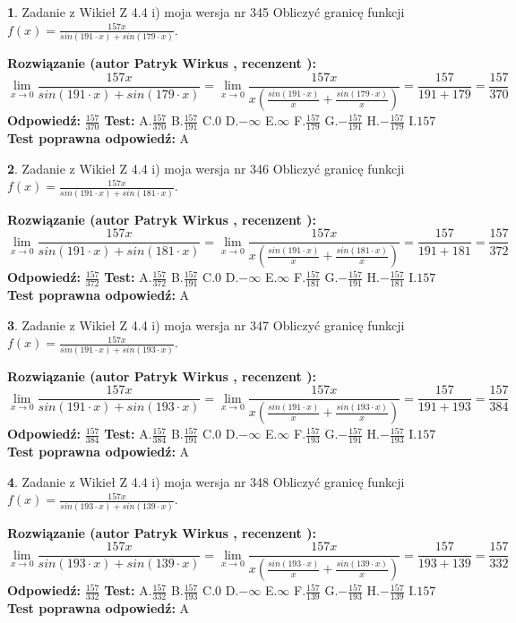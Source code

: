 \documentclass[12pt, a4paper]{article}
\theoremstyle{definition} %
\newtheorem{zad}{}
\newcommand{\zadStart}[1]{\begin{zad}#1\newline}
\newcommand{\zadStop}{\end{zad}}
\newcommand{\rozwStart}[2]{\noindent \textbf{Rozwiązanie (autor #1 , recenzent #2): }\newline}
\newcommand{\rozwStop}{\newline}
\newcommand{\odpStart}{\noindent \textbf{Odpowiedź:}\newline}
\newcommand{\odpStop}{\newline}
\newcommand{\testStart}{\noindent \textbf{Test:}\newline}
\newcommand{\testStop}{\newline}
\newcommand{\kluczStart}{\noindent \textbf{Test poprawna odpowiedź:}\newline}
\newcommand{\kluczStop}{\newline}
\begin{document}
\zadStart{Zadanie z Wikieł Z 4.4 i) moja wersja nr 345}
Obliczyć granicę funkcji $f(x)=\frac{157x}{sin(191\cdot x) +sin(179\cdot x)}$.
\zadStop
\rozwStart{Patryk Wirkus}{}
$$\lim\limits_{x\to 0}\frac{157x}{sin(191\cdot x) +sin(179\cdot x)}=\lim\limits_{x\to 0}\frac{157x}{x(\frac{sin(191\cdot x)}{x}+\frac{sin(179\cdot x)}{x})}=\frac{157}{191+179} = \frac{157}{370}$$
\rozwStop
\odpStart
$\frac{157}{370}$
\odpStop
\testStart
A.$\frac{157}{370}$
B.$\frac{157}{191}$
C.$0$
D.$-\infty$
E.$\infty$
F.$\frac{157}{179}$
G.$-\frac{157}{191}$
H.$-\frac{157}{179}$
I.$157$
\testStop
\kluczStart
A
\kluczStop



\zadStart{Zadanie z Wikieł Z 4.4 i) moja wersja nr 346}
Obliczyć granicę funkcji $f(x)=\frac{157x}{sin(191\cdot x) +sin(181\cdot x)}$.
\zadStop
\rozwStart{Patryk Wirkus}{}
$$\lim\limits_{x\to 0}\frac{157x}{sin(191\cdot x) +sin(181\cdot x)}=\lim\limits_{x\to 0}\frac{157x}{x(\frac{sin(191\cdot x)}{x}+\frac{sin(181\cdot x)}{x})}=\frac{157}{191+181} = \frac{157}{372}$$
\rozwStop
\odpStart
$\frac{157}{372}$
\odpStop
\testStart
A.$\frac{157}{372}$
B.$\frac{157}{191}$
C.$0$
D.$-\infty$
E.$\infty$
F.$\frac{157}{181}$
G.$-\frac{157}{191}$
H.$-\frac{157}{181}$
I.$157$
\testStop
\kluczStart
A
\kluczStop



\zadStart{Zadanie z Wikieł Z 4.4 i) moja wersja nr 347}
Obliczyć granicę funkcji $f(x)=\frac{157x}{sin(191\cdot x) +sin(193\cdot x)}$.
\zadStop
\rozwStart{Patryk Wirkus}{}
$$\lim\limits_{x\to 0}\frac{157x}{sin(191\cdot x) +sin(193\cdot x)}=\lim\limits_{x\to 0}\frac{157x}{x(\frac{sin(191\cdot x)}{x}+\frac{sin(193\cdot x)}{x})}=\frac{157}{191+193} = \frac{157}{384}$$
\rozwStop
\odpStart
$\frac{157}{384}$
\odpStop
\testStart
A.$\frac{157}{384}$
B.$\frac{157}{191}$
C.$0$
D.$-\infty$
E.$\infty$
F.$\frac{157}{193}$
G.$-\frac{157}{191}$
H.$-\frac{157}{193}$
I.$157$
\testStop
\kluczStart
A
\kluczStop



\zadStart{Zadanie z Wikieł Z 4.4 i) moja wersja nr 348}
Obliczyć granicę funkcji $f(x)=\frac{157x}{sin(193\cdot x) +sin(139\cdot x)}$.
\zadStop
\rozwStart{Patryk Wirkus}{}
$$\lim\limits_{x\to 0}\frac{157x}{sin(193\cdot x) +sin(139\cdot x)}=\lim\limits_{x\to 0}\frac{157x}{x(\frac{sin(193\cdot x)}{x}+\frac{sin(139\cdot x)}{x})}=\frac{157}{193+139} = \frac{157}{332}$$
\rozwStop
\odpStart
$\frac{157}{332}$
\odpStop
\testStart
A.$\frac{157}{332}$
B.$\frac{157}{193}$
C.$0$
D.$-\infty$
E.$\infty$
F.$\frac{157}{139}$
G.$-\frac{157}{193}$
H.$-\frac{157}{139}$
I.$157$
\testStop
\kluczStart
A
\kluczStop
\end{document}

